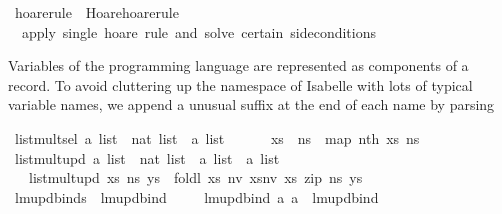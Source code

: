\begin{isabellebody}
\isanewline
{}\isamarkupfalse%
\ hoare{\isacharunderscore}rule\ {\isacharequal}\ {\isachardoublequoteopen}Hoare{\isachardot}hoare{\isacharunderscore}rule{\isachardoublequoteclose}\ \isanewline
\ \ {\isachardoublequoteopen}apply\ single\ hoare\ rule\ and\ solve\ certain\ sideconditions{\isachardoublequoteclose}%
\endisatagML
{\isafoldML}%
%
\isadelimML
%
\endisadelimML
%
\begin{isamarkuptext}%
Variables of the programming language are represented as components 
of a record. To avoid cluttering up the namespace of Isabelle with lots of 
typical variable names, we append a unusual suffix at the end of each name by 
parsing%
\end{isamarkuptext}\isamarkuptrue%
\isamarkupfalse%
\ list{\isacharunderscore}multsel{\isacharcolon}{\isacharcolon}\ {\isachardoublequoteopen}{\isacharprime}a\ list\ {\isasymRightarrow}\ nat\ list\ {\isasymRightarrow}\ {\isacharprime}a\ list{\isachardoublequoteclose}\ {\isacharparenleft}\ {\isachardoublequoteopen}{\isacharbang}{\isacharbang}{\isachardoublequoteclose}\ {}{}{}{\isacharparenright}\isanewline
\ \ \ {\isachardoublequoteopen}xs\ {\isacharbang}{\isacharbang}\ ns\ {\isacharequal}\ map\ {\isacharparenleft}nth\ xs{\isacharparenright}\ ns{\isachardoublequoteclose}\isanewline
\isanewline
{}\isamarkupfalse%
\ list{\isacharunderscore}multupd{\isacharcolon}{\isacharcolon}\ {\isachardoublequoteopen}{\isacharprime}a\ list\ {\isasymRightarrow}\ nat\ list\ {\isasymRightarrow}\ {\isacharprime}a\ list\ {\isasymRightarrow}\ {\isacharprime}a\ list{\isachardoublequoteclose}\isanewline
\ \ \ {\isachardoublequoteopen}list{\isacharunderscore}multupd\ xs\ ns\ ys\ {\isacharequal}\ foldl\ {\isacharparenleft}{\isasymlambda}xs\ {\isacharparenleft}n{\isacharcomma}v{\isacharparenright}{\isachardot}\ xs{\isacharbrackleft}n{\isacharcolon}{\isacharequal}v{\isacharbrackright}{\isacharparenright}\ xs\ {\isacharparenleft}zip\ ns\ ys{\isacharparenright}{\isachardoublequoteclose}\isanewline
\isanewline
{}\isamarkupfalse%
\ lmupdbinds\ \ lmupdbind\isanewline
\isanewline
{}\isamarkupfalse%
\isanewline
\ \ %
\isanewline
\ \ {\isachardoublequoteopen}{\isacharunderscore}lmupdbind{\isachardoublequoteclose}{\isacharcolon}{\isacharcolon}\ {\isachardoublequoteopen}{\isacharbrackleft}{\isacharprime}a{\isacharcomma}\ {\isacharprime}a{\isacharbrackright}\ {\isacharequal}{\isachargreater}\ lmupdbind{\isachardoublequoteclose}\ \ \ \ {\isacharparenleft}{\isachardoublequoteopen}{\isacharparenleft}{}{\isacharunderscore}\ {\isacharbrackleft}{\isacharcolon}{\isacharequal}{\isacharbrackright}{\isacharslash}\ {\isacharunderscore}{\isacharparenright}{\isachardoublequoteclose}{\isacharparenright}\isanewline

\end{isabellebody}
